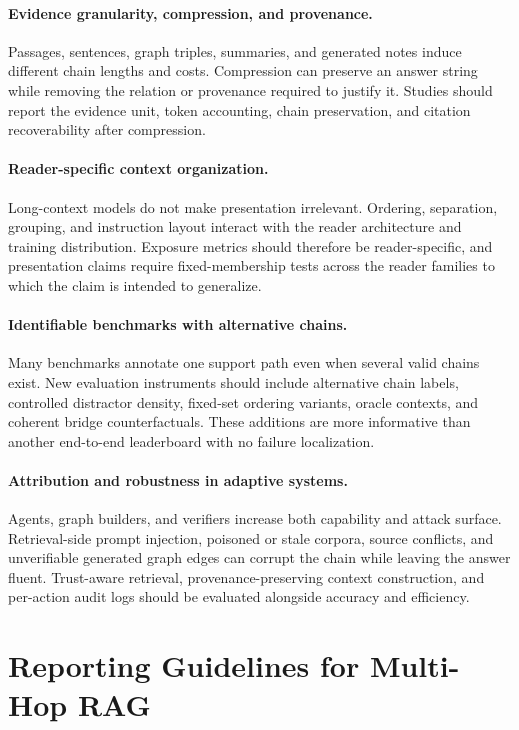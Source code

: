 \documentclass[manuscript,review]{acmart}
\theoremstyle{definition}
\theoremstyle{plain}
\theoremstyle{remark}
\begin{document}
\paragraph{Evidence granularity, compression, and provenance.}
Passages, sentences, graph triples, summaries, and generated notes induce
different chain lengths and costs. Compression can preserve an answer string
while removing the relation or provenance required to justify it. Studies
should report the evidence unit, token accounting, chain preservation, and
citation recoverability after compression.

\paragraph{Reader-specific context organization.}
Long-context models do not make presentation irrelevant. Ordering, separation,
grouping, and instruction layout interact with the reader architecture and
training distribution. Exposure metrics should therefore be reader-specific,
and presentation claims require fixed-membership tests across the reader
families to which the claim is intended to generalize.

\paragraph{Identifiable benchmarks with alternative chains.}
Many benchmarks annotate one support path even when several valid chains
exist. New evaluation instruments should include alternative chain labels,
controlled distractor density, fixed-set ordering variants, oracle contexts,
and coherent bridge counterfactuals. These additions are more informative
than another end-to-end leaderboard with no failure localization.

\paragraph{Attribution and robustness in adaptive systems.}
Agents, graph builders, and verifiers increase both capability and attack
surface. Retrieval-side prompt injection, poisoned or stale corpora, source
conflicts, and unverifiable generated graph edges can corrupt the chain while
leaving the answer fluent. Trust-aware retrieval, provenance-preserving
context construction, and per-action audit logs should be evaluated alongside
accuracy and efficiency.

\section{Reporting Guidelines for Multi-Hop RAG}
\label{sec:reporting_guidelines}
\end{document}
